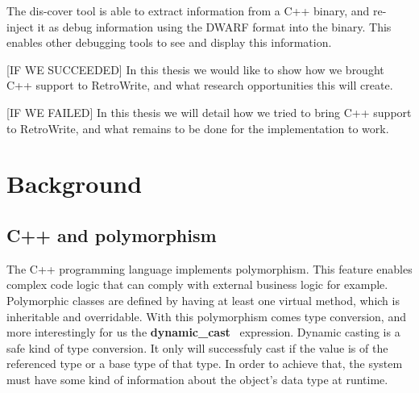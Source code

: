 \documentclass[a4paper,11pt,oneside]{report}
\begin{document}
The dis-cover tool is able to extract information from a C++ binary, and re-inject it as debug information using the DWARF format into the binary.
This enables other debugging tools to see and display this information.







[IF WE SUCCEEDED]
In this thesis we would like to show how we brought C++ support to RetroWrite, and what research opportunities this will create.

[IF WE FAILED]
In this thesis we will detail how we tried to bring C++ support to RetroWrite, and what remains to be done for the implementation to work.


\chapter{Background}



\section{C++ and polymorphism}

The C++ programming language implements polymorphism.
This feature enables complex code logic that can comply with external business logic for example.
Polymorphic classes are defined by having at least one virtual method, which is inheritable and overridable.
With this polymorphism comes type conversion, and more interestingly for us the \textbf{dynamic\_cast}~\cite{dynamiccast} expression.
Dynamic casting is a safe kind of type conversion.
It only will successfuly cast if the value is of the referenced type or a base type of that type.
In order to achieve that, the system must have some kind of information about the object's data type at runtime.
\end{document}
